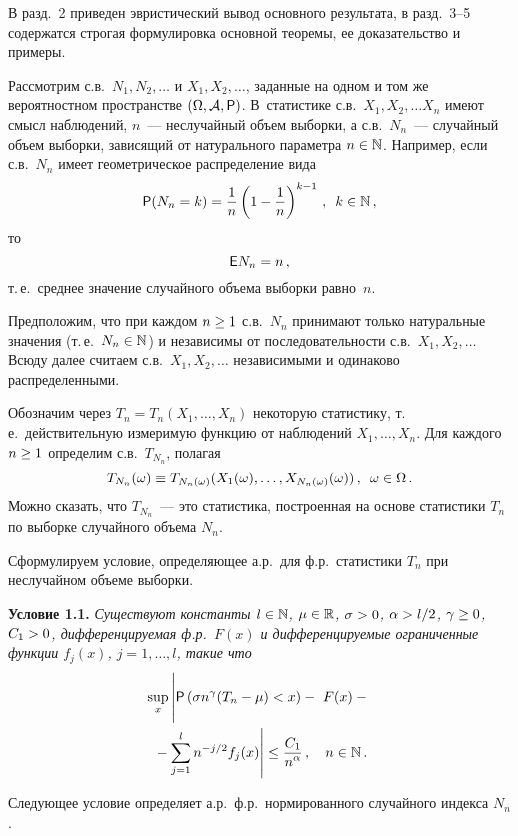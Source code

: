 \begin{multicols}{2}
В разд.~2 приведен эвристический вывод основного результата, в
разд.~3--5 содержатся строгая формулировка основной теоремы, ее
доказательство и примеры.

Рассмотрим с.в.\ $N_1, N_2, \ldots$ и  $X_1, X_2,\ldots$, 
заданные на одном и том же вероятностном пространстве
$(\Omega, {\cal A}, {{\sf P}})$. В~статистике с.в.\ $X_1, X_2, \ldots X_n$
имеют смысл наблюдений, $n$~--- неслучайный объем выборки, а с.в.\
$N_n$~--- случайный объем выборки, зависящий от натурального
параметра $n\hm\in \N$. Например, если с.в.~$N_n$ имеет геометрическое
распределение вида
$$
{{\sf P}}(N_n = k) =  \displaystyle\frac{\displaystyle 1\mathstrut}{\displaystyle n\mathstrut} \left(1 - \displaystyle\frac{\displaystyle 1\mathstrut}{\displaystyle n\mathstrut}\right)^{k-1}\,,\enskip
 k\in\mathbb N\,,
$$
то
$$
{\sf E} N_n = n\,,
$$
т.\,е.\ среднее значение случайного объема выборки равно~$n$.

Предположим, что при каждом $n\hm\geq1$ с.в.~$N_n$ принимают только
натуральные значения (т.\,е.\ $N_n\hm\in \N$) и независимы от
последовательности с.в.\ $X_1, X_2, \ldots$ Всюду далее считаем с.в.\
$X_1, X_2, \ldots$ независимыми и одинаково распределенными.

Обозначим через  $T_n=T_n(X_1,\ldots ,X_n)$ некоторую статистику, т.\,е.\
действительную измеримую функцию от наблюдений $X_1,\ldots ,X_n$.
Для каждого  $n\hm\geq1$ определим с.в.\ $T_{N_n}$, полагая
$$
T_{N_n}(\omega)\equiv
T_{N_n(\omega)}(X_1(\omega),\ldots ,X_{N_n(\omega)}(\omega))\,, \enskip
\omega\in\Omega\,.
$$
Можно сказать, что $T_{N_n}$~--- это статистика, построенная на
основе статистики $T_n$ по выборке случайного объема $N_n$.

Сформулируем условие, определяющее а.р.\ для ф.р.\ статистики $T_n$
при неслучайном объеме вы\-борки.

\smallskip

\noindent
\textbf{Условие 1.1.} \textit{Существуют константы  $l\hm\in\N$, $\mu\hm\in\R$,
$\sigma\hm>0$, $\alpha\hm>l/2$, $\gamma\hm\ge0$, $C_1\hm>0$, дифференцируемая
ф.р.\ $F(x)$ и дифференцируемые ограниченные функции $f_j(x)$,
$j=1,\ldots ,l$, такие что}
\begin{multline*}
\sup\limits_x \left|\vphantom{\sum\limits_{j=1}^l}
{\p}\left(\sigma n^\gamma(T_n - \mu) < x\right) -\ F(x)
-{}\right.\\
\left.{}- \sum\limits_{j=1}^l n^{-j/2} f_j(x) \right|  \leq \fr{C_1}{n^{\alpha}}\,,
  \ \ \ n\in\N\,.
\end{multline*}

\smallskip

Следующее условие определяет а.р.\ ф.р.\ нормированного случайного
индекса $N_n$.


\end{multicols}
